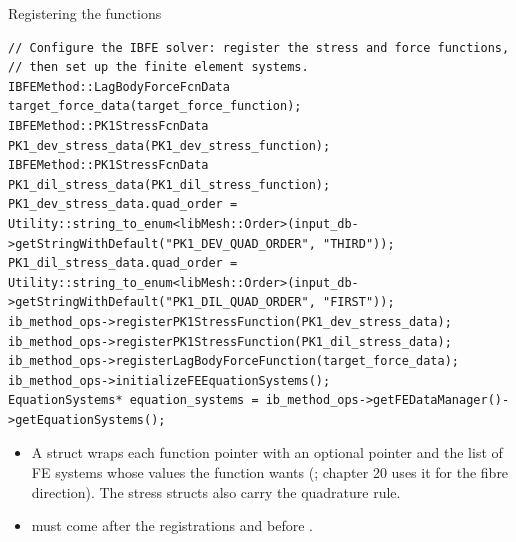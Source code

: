 \documentclass[aspectratio=169,11pt]{beamer}
\begin{document}
\begin{frame}[fragile]{Registering the functions}
\label{fr:register}
\footnotesize
\begin{lstlisting}[style=cpptiny]
// Configure the IBFE solver: register the stress and force functions,
// then set up the finite element systems.
IBFEMethod::LagBodyForceFcnData target_force_data(target_force_function);
IBFEMethod::PK1StressFcnData PK1_dev_stress_data(PK1_dev_stress_function);
IBFEMethod::PK1StressFcnData PK1_dil_stress_data(PK1_dil_stress_function);
PK1_dev_stress_data.quad_order = Utility::string_to_enum<libMesh::Order>(input_db->getStringWithDefault("PK1_DEV_QUAD_ORDER", "THIRD"));
PK1_dil_stress_data.quad_order = Utility::string_to_enum<libMesh::Order>(input_db->getStringWithDefault("PK1_DIL_QUAD_ORDER", "FIRST"));
ib_method_ops->registerPK1StressFunction(PK1_dev_stress_data);
ib_method_ops->registerPK1StressFunction(PK1_dil_stress_data);
ib_method_ops->registerLagBodyForceFunction(target_force_data);
ib_method_ops->initializeFEEquationSystems();
EquationSystems* equation_systems = ib_method_ops->getFEDataManager()->getEquationSystems();
\end{lstlisting}
\begin{itemize}
  \item A  struct wraps each function pointer with an optional  pointer and the list of FE systems whose values the function wants (; chapter 20 uses it for the fibre direction). The stress structs also carry the quadrature rule.
  \item {} must come after the registrations and before .
\end{itemize}
\end{frame}
\end{document}
